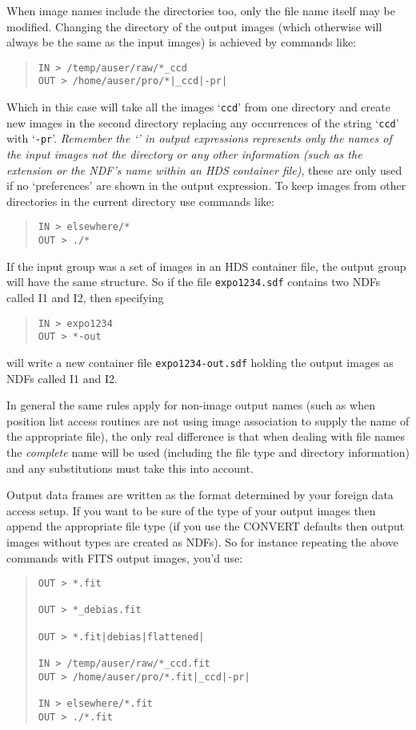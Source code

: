 \documentclass[twoside,11pt]{article}
\renewcommand{\_}{\texttt{\symbol{95}}}
\newenvironment{myquote}{\begin{quote}\begin{small}}{\end{small}\end{quote}}
\newcommand{\text}[1]{{\small \tt #1}}
\begin{document}
When image names include the directories too, only the file name itself may
be modified. Changing the directory of the output images (which otherwise
will always be the same as the input images) is achieved by commands
like:
\begin{myquote}
\begin{verbatim}
IN > /temp/auser/raw/*_ccd
OUT > /home/auser/pro/*|_ccd|-pr|
\end{verbatim}
\end{myquote}
Which in this case will take all the images `\text{*\_ccd}' from one
directory and create new images in the second directory replacing any
occurrences of the string
`\text{\_ccd}' with `\text{-pr}'. {\em Remember the
`\text{*}' in output expressions represents only the names of
the input images not the directory or any other information (such as
the extension or the NDF's name within an HDS container file)}, 
these are only used if no `preferences' are shown
in the output expression. To keep images from other directories
in the current directory use commands like:
\begin{myquote}
\begin{verbatim}
IN > elsewhere/*
OUT > ./*
\end{verbatim}
\end{myquote}

If the input group was a set of images in an HDS container file,
the output group will have the same structure.
So if the file \text{expo1234.sdf} 
contains two NDFs called I1 and I2, then specifying
\begin{myquote}
\begin{verbatim}
IN > expo1234
OUT > *-out
\end{verbatim}
\end{myquote}
will write a new container file \text{expo1234-out.sdf}
holding the output images as NDFs called I1 and I2.

In general the same rules apply for non-image output names (such as
when position list access routines are not using image association to
supply the name of the appropriate file), the only real difference is
that when dealing with file names the {\em complete} name will be used
(including the file type and directory information) and any
substitutions must take this into account.

Output data frames are written as the format determined by your
foreign data access setup. If you want to be sure of the type of your
output images then append the appropriate file type (if you use the
CONVERT defaults then output images without types are created as
NDFs). So for instance repeating the above commands with FITS output
images, you'd use:
\begin{myquote}
\begin{verbatim}
OUT > *.fit

OUT > *_debias.fit

OUT > *.fit|debias|flattened|

IN > /temp/auser/raw/*_ccd.fit
OUT > /home/auser/pro/*.fit|_ccd|-pr|

IN > elsewhere/*.fit
OUT > ./*.fit
\end{verbatim}
\end{myquote}
\end{document}
